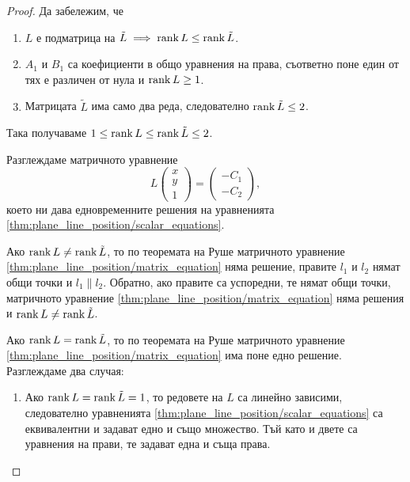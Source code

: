 \documentclass{../../common/topic}
\begin{document}
\begin{proof}
  Да забележим, че
  \begin{enumerate}
    \item \( L \) е подматрица на \( \tilde L \implies \operatorname{rank} L \leq \operatorname{rank} \tilde L \).
    \item \( A_1 \) и \( B_1 \) са коефициенти в общо уравнения на права, съответно поне един от тях е различен от нула и \( \operatorname{rank} L \geq 1 \).
    \item Матрицата \( \tilde L \) има само два реда, следователно \( \operatorname{rank} \tilde L \leq 2 \).
  \end{enumerate}

  Така получаваме \( 1 \leq \operatorname{rank} L \leq \operatorname{rank} \tilde L \leq 2 \).

  Разглеждаме матричното уравнение
  \begin{equation}\label{thm:plane_line_position/matrix_equation}
    L
    \begin{pmatrix}
      x \\ y \\ 1
    \end{pmatrix}
    =
    \begin{pmatrix}
      -C_1 \\ -C_2
    \end{pmatrix},
  \end{equation}
  което ни дава едновременните решения на уравненията \eqref{thm:plane_line_position/scalar_equations}.

  Ако \( \operatorname{rank} L \neq \operatorname{rank} \tilde L \), то по теоремата на Руше матричното уравнение \eqref{thm:plane_line_position/matrix_equation} няма решение, правите \( l_1 \) и \( l_2 \) нямат общи точки и \( l_1 \parallel l_2 \). Обратно, ако правите са успоредни, те нямат общи точки, матричното уравнение \eqref{thm:plane_line_position/matrix_equation} няма решения и \( \operatorname{rank} L \neq \operatorname{rank} \tilde L \).

  Ако \( \operatorname{rank} L = \operatorname{rank} \tilde L \), то по теоремата на Руше матричното уравнение \eqref{thm:plane_line_position/matrix_equation} има поне едно решение. Разглеждаме два случая:
  \begin{enumerate}
    \item Ако \( \operatorname{rank} L = \operatorname{rank} \tilde L = 1 \), то редовете на \( L \) са линейно зависими, следователно уравненията \eqref{thm:plane_line_position/scalar_equations} са еквивалентни и задават едно и също множество. Тъй като и двете са уравнения на прави, те задават една и съща права.


\end{enumerate}
\end{proof}
\end{document}

